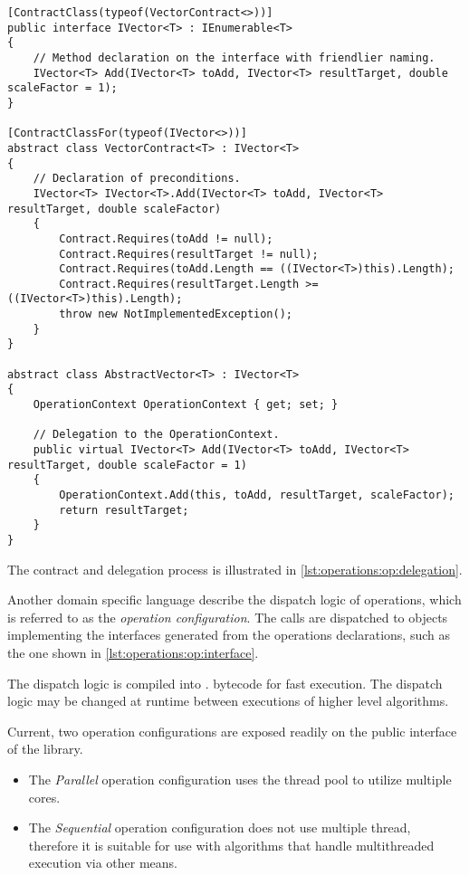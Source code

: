 \begin{lstlisting}[float,caption={Delegation of operations to the
    context (excerpt).},label=lst:operations:op:delegation]
[ContractClass(typeof(VectorContract<>))]
public interface IVector<T> : IEnumerable<T>
{
    // Method declaration on the interface with friendlier naming.
    IVector<T> Add(IVector<T> toAdd, IVector<T> resultTarget, double scaleFactor = 1);
}

[ContractClassFor(typeof(IVector<>))]
abstract class VectorContract<T> : IVector<T>
{
    // Declaration of preconditions.
    IVector<T> IVector<T>.Add(IVector<T> toAdd, IVector<T> resultTarget, double scaleFactor)
    {
        Contract.Requires(toAdd != null);
        Contract.Requires(resultTarget != null);
        Contract.Requires(toAdd.Length == ((IVector<T>)this).Length);
        Contract.Requires(resultTarget.Length >= ((IVector<T>)this).Length);
        throw new NotImplementedException();
    }
}

abstract class AbstractVector<T> : IVector<T>
{
    OperationContext OperationContext { get; set; }

    // Delegation to the OperationContext.
    public virtual IVector<T> Add(IVector<T> toAdd, IVector<T> resultTarget, double scaleFactor = 1)
    {
        OperationContext.Add(this, toAdd, resultTarget, scaleFactor);
        return resultTarget;
    }
}
\end{lstlisting}

The contract and delegation process is illustrated in
\cref{lst:operations:op:delegation}.

Another domain specific language describe the dispatch logic of
operations, which is referred to as the \emph{operation
  configuration}. The calls are dispatched to objects implementing
the interfaces generated from the operations declarations, such as the
one shown in \cref{lst:operations:op:interface}.

The dispatch logic is compiled into .  bytecode
for fast execution. The dispatch logic may be changed at runtime
between executions of higher level algorithms.

Current, two operation configurations are exposed readily on the
public interface of the library.
\begin{itemize}
\item The \emph{Parallel} operation configuration uses the thread pool
  to utilize multiple  cores.
\item The \emph{Sequential} operation configuration does not use
  multiple thread, therefore it is suitable for use with algorithms
  that handle multithreaded execution via other means.
\end{itemize}

